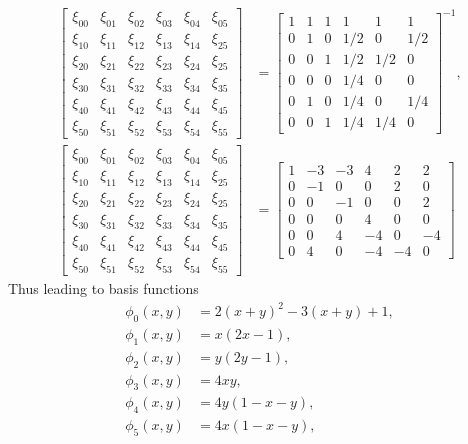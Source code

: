 \documentclass[12pt]{ociamthesis}
\begin{document}
\begin{align}
\left[ \begin{matrix}
\xi_{00} & \xi_{01} & \xi_{02} & \xi_{03} & \xi_{04} & \xi_{05}\\
\xi_{10} & \xi_{11} & \xi_{12} & \xi_{13} & \xi_{14} & \xi_{25}\\
\xi_{20} & \xi_{21} & \xi_{22} & \xi_{23} & \xi_{24} & \xi_{25}\\
\xi_{30} & \xi_{31} & \xi_{32} & \xi_{33} & \xi_{34} & \xi_{35}\\
\xi_{40} & \xi_{41} & \xi_{42} & \xi_{43} & \xi_{44} & \xi_{45}\\
\xi_{50} & \xi_{51} & \xi_{52} & \xi_{53} & \xi_{54} & \xi_{55}
\end{matrix} \right] &= 
\left[ \begin{matrix}
1 & 1 & 1 & 1 & 1 & 1\\
0 & 1 & 0 & 1/2 & 0 & 1/2\\
0 & 0 & 1 & 1/2 & 1/2 & 0\\
0 & 0 & 0 & 1/4 & 0 & 0\\
0 & 1 & 0 & 1/4 & 0 & 1/4\\
0 & 0 & 1 & 1/4 & 1/4 & 0
\end{matrix} \right]^{-1}, \\
\left[ \begin{matrix}
\xi_{00} & \xi_{01} & \xi_{02} & \xi_{03} & \xi_{04} & \xi_{05}\\
\xi_{10} & \xi_{11} & \xi_{12} & \xi_{13} & \xi_{14} & \xi_{25}\\
\xi_{20} & \xi_{21} & \xi_{22} & \xi_{23} & \xi_{24} & \xi_{25}\\
\xi_{30} & \xi_{31} & \xi_{32} & \xi_{33} & \xi_{34} & \xi_{35}\\
\xi_{40} & \xi_{41} & \xi_{42} & \xi_{43} & \xi_{44} & \xi_{45}\\
\xi_{50} & \xi_{51} & \xi_{52} & \xi_{53} & \xi_{54} & \xi_{55}
\end{matrix} \right] &= 
\left[ \begin{matrix}
1 & -3 & -3 & 4 & 2 & 2\\
0 & -1 & 0 & 0 & 2 & 0\\
0 & 0 & -1 & 0 & 0 & 2\\
0 & 0 & 0 & 4 & 0 & 0\\
0 & 0 & 4 & -4 & 0 & -4\\
0 & 4 & 0 & -4 & -4 & 0
\end{matrix} \right]
\end{align}
Thus leading to basis functions
\begin{align}
\phi_0(x,y) &= 2(x+y)^2 - 3(x+y) + 1, \\
\phi_1(x,y) &= x(2x-1), \\
\phi_2(x,y) &= y(2y-1), \\
\phi_3(x,y) &= 4xy, \\
\phi_4(x,y) &= 4y(1-x-y), \\
\phi_5(x,y) &= 4x(1-x-y),
\end{align}
\end{document}
